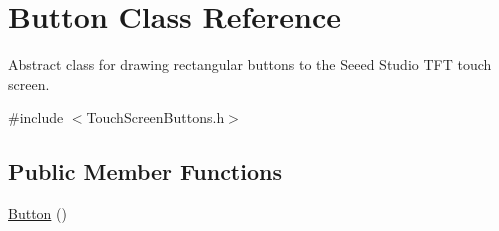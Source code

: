 \hypertarget{class_button}{\section{Button Class Reference}
\label{class_button}
}


Abstract class for drawing rectangular buttons to the Seeed Studio T\+F\+T touch screen.  




{\ttfamily \#include $<$Touch\+Screen\+Buttons.\+h$>$}

\subsection*{Public Member Functions}
\begin{DoxyCompactItemize}
\item 
\hypertarget{class_button_a3b36df1ae23c58aedb9e15a713159459}{\hyperlink{class_button_a3b36df1ae23c58aedb9e15a713159459}{Button} ()}\label{class_button_a3b36df1ae23c58aedb9e15a713159459}


\end{DoxyCompactItemize}
